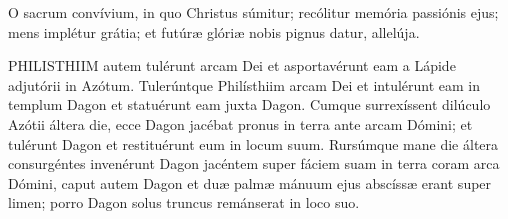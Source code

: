 
 O sacrum convívium, in quo Christus súmitur; recólitur memória passiónis ejus; mens implétur grátia; et futúræ glóriæ nobis pignus datur, allelúja.






\lettrine[lines=2]{P}{HILISTHIIM} autem tulérunt arcam Dei et asportavérunt eam a Lápide adjutórii in Azótum. Tulerúntque Philísthiim arcam Dei et intulérunt eam in templum Dagon et statuérunt eam juxta Dagon. Cumque surrexíssent dilúculo Azótii áltera die, ecce Dagon jacébat pronus in terra ante arcam Dómini; et tulérunt Dagon et restituérunt eum in locum suum. Rursúmque mane die áltera consurgéntes invenérunt Dagon jacéntem super fáciem suam in terra coram arca Dómini, caput autem Dagon et duæ palmæ mánuum ejus abscíssæ erant super limen; porro Dagon solus truncus remánserat in loco suo.

